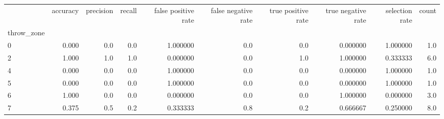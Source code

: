 \begin{tabular}{lrrrrrrrrr}
\toprule
{} &  accuracy &  precision &  recall &  false positive rate &  false negative rate &  true positive rate &  true negative rate &  selection rate &  count \\
throw\_zone &           &            &         &                      &                      &                     &                     &                 &        \\
\midrule
0          &     0.000 &        0.0 &     0.0 &             1.000000 &                  0.0 &                 0.0 &            0.000000 &        1.000000 &    1.0 \\
2          &     1.000 &        1.0 &     1.0 &             0.000000 &                  0.0 &                 1.0 &            1.000000 &        0.333333 &    6.0 \\
4          &     0.000 &        0.0 &     0.0 &             1.000000 &                  0.0 &                 0.0 &            0.000000 &        1.000000 &    1.0 \\
5          &     0.000 &        0.0 &     0.0 &             1.000000 &                  0.0 &                 0.0 &            0.000000 &        1.000000 &    1.0 \\
6          &     1.000 &        0.0 &     0.0 &             0.000000 &                  0.0 &                 0.0 &            1.000000 &        0.000000 &    3.0 \\
7          &     0.375 &        0.5 &     0.2 &             0.333333 &                  0.8 &                 0.2 &            0.666667 &        0.250000 &    8.0 \\
\bottomrule
\end{tabular}
